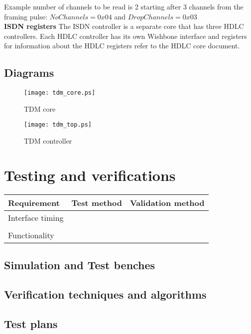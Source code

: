 \documentclass[a4paper,11pt]{article}
\begin{document}
Example number of channels to be read is 2 starting after 3 channels from the framing pulse: $NoChannels = 0x04$ and $DropChannels = 0x03$\\


\textbf{ISDN registers} The ISDN controller is a separate core that has three HDLC controllers. Each HDLC controller has its own Wishbone interface and registers for information about the HDLC registers refer to the HDLC core document.



\subsection{Diagrams}

\begin{figure}[!h]
\texttt{[image: tdm\_core.ps]}
\caption{TDM core}\label{Core}
\end{figure}


\begin{figure}[!h]
\texttt{[image: tdm\_top.ps]}
\caption{TDM controller}\label{top}
\end{figure}

\section{Testing and verifications}


\begin{tabular}{|l|l|l|}
\hline
Requirement & Test method & Validation method \\
\hline
\hline
Interface timing & &\\
\hline
& & \\
\hline
\hline
Functionality & & \\
\hline
\end{tabular}
\subsection{Simulation and Test benches}

\subsection{Verification techniques and algorithms}

\subsection{Test plans}
\end{document}
